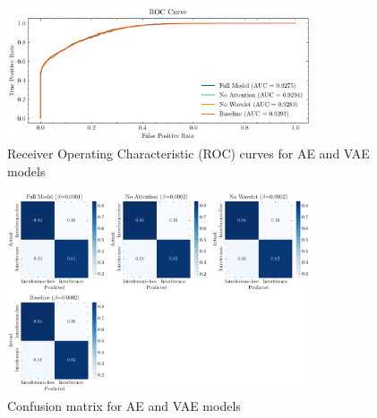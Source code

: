\documentclass[12pt]{article}
\begin{document}
\begin{figure}
    \centering
    \includegraphics[width=0.8\textwidth]{roc.pdf}
    \caption{Receiver Operating Characteristic (ROC) curves for AE and VAE models}
    \label{fig:roc}
\end{figure}


\begin{figure}[htbp]
    \centering
    \includegraphics[width=0.8\textwidth]{confusion.pdf}
    \caption{Confusion matrix for AE and VAE models}
    \label{fig:prc}
    
\end{figure}

\medskip

\printbibliography
\end{document}
